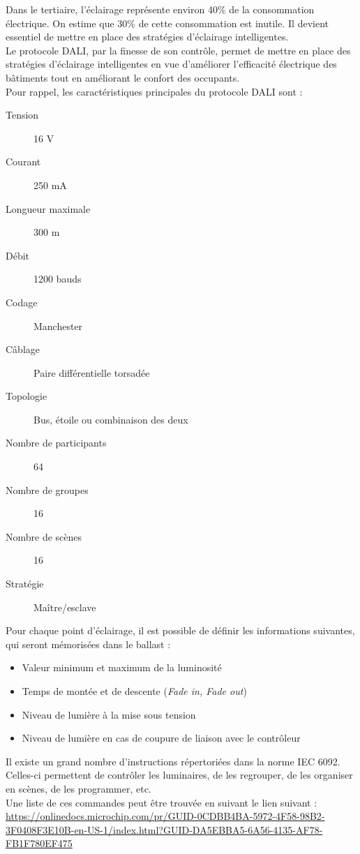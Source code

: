 


Dans le tertiaire, l'éclairage représente environ 40\% de la consommation électrique. On estime que 30\% de cette consommation est inutile. Il devient essentiel de mettre en place des stratégies d'éclairage intelligentes.\\

Le protocole DALI, par la finesse de son contrôle, permet de mettre en place des stratégies d'éclairage intelligentes en vue d'améliorer l'efficacité électrique des bâtiments tout en améliorant le confort des occupants.\\

Pour rappel, les caractéristiques principales du protocole DALI sont :

\begin{multicols}{3}
	\begin{description}
\item[Tension] 16 V
\item[Courant] 250 mA
\item[Longueur maximale] 300 m
\item[Débit] 1200 bauds
\item[Codage] Manchester
\item[Câblage] Paire différentielle torsadée
\item[Topologie] Bus, étoile ou combinaison des deux
\item[Nombre de participants] 64
\item[Nombre de groupes] 16
\item[Nombre de scènes] 16
\item[Stratégie] Maître/esclave
\end{description}
\end{multicols}

Pour chaque point d'éclairage, il est possible de définir les informations suivantes, qui seront mémorisées dans le ballast :
\begin{itemize}
	\item Valeur minimum et maximum de la luminosité
	\item Temps de montée et de descente (\textit{Fade in, Fade out})
	\item Niveau de lumière à la mise sous tension
	\item Niveau de lumière en cas de coupure de liaison avec le contrôleur
\end{itemize}

Il existe un grand nombre d'instructions répertoriées dans la norme IEC 6092. Celles-ci permettent de contrôler les luminaires, de les regrouper, de les organiser en scènes, de les programmer, etc.\\ Une liste de ces commandes peut être trouvée en suivant le lien suivant : \url{https://onlinedocs.microchip.com/pr/GUID-0CDBB4BA-5972-4F58-98B2-3F0408F3E10B-en-US-1/index.html?GUID-DA5EBBA5-6A56-4135-AF78-FB1F780EF475}

